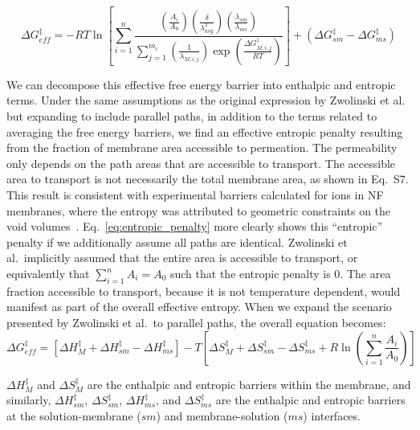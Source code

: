\documentclass[12pt]{article}
\begin{document}
\begin{equation}
    \Delta G_{eff}^{\ddagger} = -R T \ln{\left[ \sum_{i=1}^{n} \frac{ \displaystyle \left( \frac{A_i}{A_0} \right) \left( \frac{\delta}{\lambda_{avg}^2} \right) \left( \frac{\lambda_{sm}}{\lambda_{ms}} \right) }{\displaystyle \sum_{j=1}^{m_i} \left( \frac{1}{\lambda_{M,i,j}} \right) \exp{\left( \frac{\Delta G_{M,i,j}^{\ddagger}}{R T} \right) }} \right]} + \left( \Delta G_{sm}^{\ddagger} - \Delta G_{ms}^{\ddagger}\right)
    \label{eq:effective_barrier}
\end{equation}

We can decompose this effective free energy barrier into enthalpic and entropic terms. Under the same assumptions as the original expression by Zwolinski et al. but expanding to include parallel paths, in addition to the terms related to averaging the free energy barriers, we find an effective entropic penalty resulting from the fraction of membrane area accessible to permeation. The permeability only depends on the path areas that are accessible to transport. The accessible area to transport is not necessarily the total membrane area, as shown in Eq.~S7. This result is consistent with experimental barriers calculated for ions in NF membranes, where the entropy was attributed to geometric constraints on the void volumes~\cite{epsztein_elucidating_2018,shefer_enthalpic_2021}. Eq.~\ref{eq:entropic_penalty} more clearly shows this ``entropic'' penalty if we additionally assume all paths are identical. Zwolinski et al.~implicitly assumed that the entire area is accessible to transport, or equivalently that $\sum_{i=1}^{n} A_i = A_0$ such that the entropic penalty is 0. The area fraction accessible to transport, because it is not temperature dependent, would manifest as part of the overall effective entropy. When we expand the scenario presented by Zwolinski et al.~to parallel paths, the overall equation becomes:
\begin{equation}
    \Delta G_{eff}^{\ddagger} = \left[ \Delta H_{M}^{\ddagger} + \Delta H_{sm}^{\ddagger} - \Delta H_{ms}^{\ddagger} \right] - T \left[ \Delta S_{M}^{\ddagger} + \Delta S_{sm}^{\ddagger} - \Delta S_{ms}^{\ddagger} + R \ln{ \left( \sum_{i=1}^n \frac{A_i}{A_0} \right) } \right] 
    \label{eq:entropic_penalty}
\end{equation}

\noindent $\Delta H_M^{\ddagger}$ and $\Delta S_M^{\ddagger}$ are the enthalpic and entropic barriers within the membrane, and similarly, $\Delta H_{sm}^{\ddagger}$, $\Delta S_{sm}^{\ddagger}$, $\Delta H_{ms}^{\ddagger}$, and $\Delta S_{ms}^{\ddagger}$ are the enthalpic and entropic barriers at the solution-membrane ($sm$) and membrane-solution ($ms$) interfaces.
\end{document}
